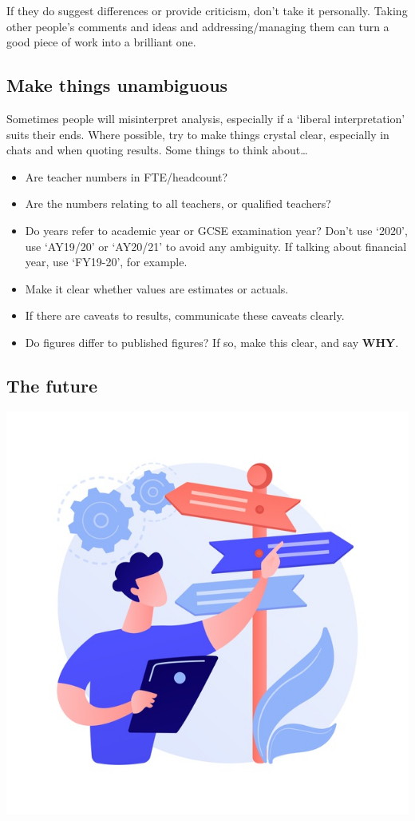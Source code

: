 \documentclass[
]{article}
\begin{document}
If they do suggest differences or provide criticism, don't take it personally. Taking other people's comments and ideas and addressing/managing them can turn a good piece of work into a brilliant one.

\hypertarget{make-things-unambiguous}{%
\subsection{Make things unambiguous}\label{make-things-unambiguous}}

Sometimes people will misinterpret analysis, especially if a `liberal interpretation' suits their ends. Where possible, try to make things crystal clear, especially in chats and when quoting results. Some things to think about\ldots{}

\begin{itemize}
\item
  Are teacher numbers in FTE/headcount?
\item
  Are the numbers relating to all teachers, or qualified teachers?
\item
  Do years refer to academic year or GCSE examination year? Don't use `2020', use `AY19/20' or `AY20/21' to avoid any ambiguity. If talking about financial year, use `FY19-20', for example.
\item
  Make it clear whether values are estimates or actuals.
\item
  If there are caveats to results, communicate these caveats clearly.
\item
  Do figures differ to published figures? If so, make this clear, and say \textbf{WHY}.
\end{itemize}

\hypertarget{the-future}{%
\subsection{The future}\label{the-future}}

\includegraphics{pictures/future_pic.jpg}
\end{document}
